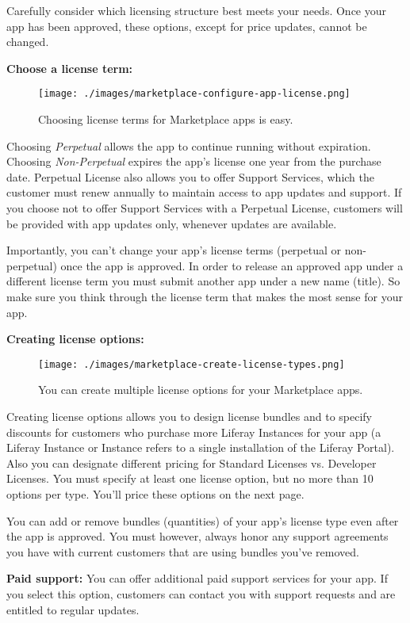 Carefully consider which licensing structure best meets your needs. Once
your app has been approved, these options, except for price updates,
cannot be changed.

\textbf{Choose a license term:}

\begin{figure}
\centering
\texttt{[image: ./images/marketplace-configure-app-license.png]}
\caption{Choosing license terms for Marketplace apps is easy.}
\end{figure}

Choosing \emph{Perpetual} allows the app to continue running without
expiration. Choosing \emph{Non-Perpetual} expires the app's license one
year from the purchase date. Perpetual License also allows you to offer
Support Services, which the customer must renew annually to maintain
access to app updates and support. If you choose not to offer Support
Services with a Perpetual License, customers will be provided with app
updates only, whenever updates are available.

Importantly, you can't change your app's license terms (perpetual or
non-perpetual) once the app is approved. In order to release an approved
app under a different license term you must submit another app under a
new name (title). So make sure you think through the license term that
makes the most sense for your app.

\textbf{Creating license options:}

\begin{figure}
\centering
\texttt{[image: ./images/marketplace-create-license-types.png]}
\caption{You can create multiple license options for your Marketplace
apps.}
\end{figure}

Creating license options allows you to design license bundles and to
specify discounts for customers who purchase more Liferay Instances for
your app (a Liferay Instance or Instance refers to a single installation
of the Liferay Portal). Also you can designate different pricing for
Standard Licenses vs. Developer Licenses. You must specify at least one
license option, but no more than 10 options per type. You'll price these
options on the next page.

You can add or remove bundles (quantities) of your app's license type
even after the app is approved. You must however, always honor any
support agreements you have with current customers that are using
bundles you've removed.

\textbf{Paid support:} You can offer additional paid support services
for your app. If you select this option, customers can contact you with
support requests and are entitled to regular updates.


